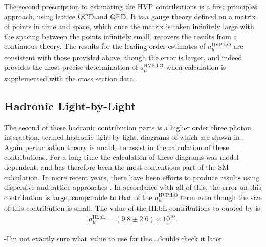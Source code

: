 The second prescription to estimating the HVP contributions is a first principles approach, using lattice QCD and QED. It is a gauge theory defined on a matrix of points in time and space, which once the matrix is taken infinitely large with the spacing between the points infinitely small, recovers the results from a continuous theory. The results for the leading order estimates of $a_{\mu}^{\text{HVP;LO}}$ are consistent with those provided above, though the error is larger, and indeed provides the most precise determination of $a_{\mu}^{\text{HVP;LO}}$ when calculation is supplemented with the cross section data \cite{Lattice}.



\subsection*{Hadronic Light-by-Light}
\label{subsec:HLbL}

The second of these hadronic contribution parts is a higher order three photon interaction, termed hadronic light-by-light, diagrams of which are shown in . Again perturbation theory is unable to assist in the calculation of these contributions. For a long time the calculation of these diagrams was model dependent, and has therefore been the most contentious part of the SM calculation. In more recent years, there have been efforts to produce results using dispersive and lattice approaches \cite{HLbL1}. In accordance with all of this, the error on this contribution is large, comparable to that of the $a_{\mu}^{\text{HVP;LO}}$ term even though the size of this contribution is small. The value of the HLbL contributions to \amu quoted by  is
		\begin{align}
            a_{\mu}^{\text{HLbL}} = (9.8 \pm 2.6) \times 10^{10}.
		\end{align}


-I'm not exactly sure what value to use for this...double check it later


